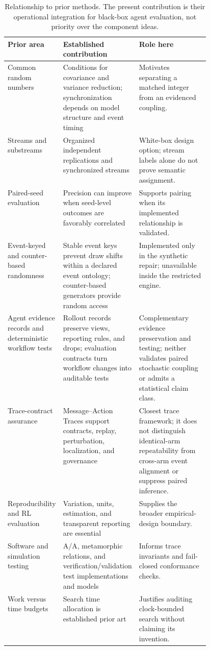\begin{table}[t]
\caption{Relationship to prior methods. The present contribution is their operational integration for black-box agent evaluation, not priority over the component ideas.}
\label{tab:prior-work}
\footnotesize
\begin{tabularx}{\linewidth}{>{\raggedright\arraybackslash}p{0.18\linewidth}>{\raggedright\arraybackslash}p{0.28\linewidth}>{\raggedright\arraybackslash}X}
\toprule
Prior area & Established contribution & Role here \\
\midrule
Common random numbers & Conditions for covariance and variance reduction; synchronization depends on model structure and event timing \cite{glasserman1992crn} & Motivates separating a matched integer from an evidenced coupling. \\
Streams and substreams & Organized independent replications and synchronized streams \cite{lecuyer2002streams} & White-box design option; stream labels alone do not prove semantic assignment. \\
Paired-seed evaluation & Precision can improve when seed-level outcomes are favorably correlated \cite{sharma2025pairedseeds} & Supports pairing when its implemented relationship is validated. \\
Event-keyed and counter-based randomness & Stable event keys prevent draw shifts within a declared event ontology; counter-based generators provide random access \cite{buffalo2026eventkeyed,salmon2011parallel} & Implemented only in the synthetic repair; unavailable inside the restricted engine. \\
Agent evidence records and deterministic workflow tests & Rollout records preserve views, reporting rules, and drops; evaluation contracts turn workflow changes into auditable tests \cite{masters2026rolloutcards,anand2026aeval} & Complementary evidence preservation and testing; neither validates paired stochastic coupling or admits a statistical claim class. \\
Trace-contract assurance & Message--Action Traces support contracts, replay, perturbation, localization, and governance \cite{paduraru2026traceassurance} & Closest trace framework; it does not distinguish identical-arm repeatability from cross-arm event alignment or suppress paired inference. \\
Reproducibility and RL evaluation & Variation, units, estimation, and transparent reporting are essential \cite{bouthillier2019reproducible,patterson2024empirical,agarwal2021statistical,pineau2021reproducibility} & Supplies the broader empirical-design boundary. \\
Software and simulation testing & A/A, metamorphic relations, and verification/validation test implementations and models \cite{kohavi2010aa,lin2020exploratorymt,raunak2021metamorphic,sargent2013verification} & Informs trace invariants and fail-closed conformance checks. \\
Work versus time budgets & Search time allocation is established prior art \cite{baier2016timemanagement} & Justifies auditing clock-bounded search without claiming its invention. \\
\bottomrule
\end{tabularx}
\end{table}

